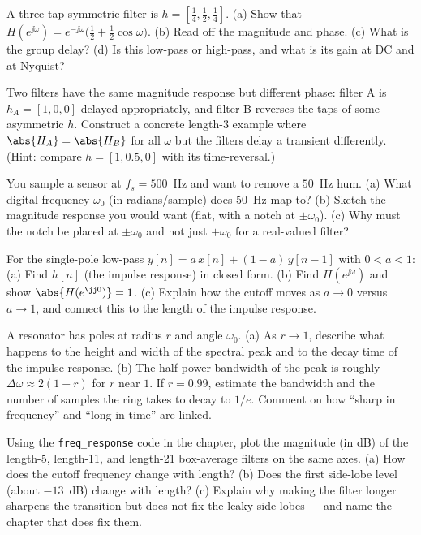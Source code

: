 \begin{exercise}
A three-tap symmetric filter is $h=[\tfrac14,\tfrac12,\tfrac14]$. (a) Show that
$H(e^{\jj\omega}) = e^{-\jj\omega}\big(\tfrac12 + \tfrac12\cos\omega\big)$.
(b) Read off the magnitude and phase. (c) What is the group delay? (d) Is this
low-pass or high-pass, and what is its gain at DC and at Nyquist?
\end{exercise}

\begin{exercise}
Two filters have the same magnitude response but different phase: filter A is
$h_A=[1,0,0]$ delayed appropriately, and filter B reverses the taps of some
asymmetric $h$. Construct a concrete length-3 example where $\abs{H_A}=\abs{H_B}$
for all $\omega$ but the filters delay a transient differently. (Hint: compare
$h=[1, 0.5, 0]$ with its time-reversal.)
\end{exercise}

\begin{exercise}
You sample a sensor at $f_s = 500$~Hz and want to remove a $50$~Hz hum.
(a) What digital frequency $\omega_0$ (in radians/sample) does $50$~Hz map to?
(b) Sketch the magnitude response you would want (flat, with a notch at
$\pm\omega_0$). (c) Why must the notch be placed at $\pm\omega_0$ and not just
$+\omega_0$ for a real-valued filter?
\end{exercise}

\begin{exercise}
For the single-pole low-pass $y[n]=a\,x[n]+(1-a)\,y[n-1]$ with $0<a<1$:
(a) Find $h[n]$ (the impulse response) in closed form.
(b) Find $H(e^{\jj\omega})$ and show $\abs{H(e^{\jj0})}=1$.
(c) Explain how the cutoff moves as $a\to 0$ versus $a\to 1$, and connect this
to the length of the impulse response.
\end{exercise}

\begin{exercise}
A resonator has poles at radius $r$ and angle $\omega_0$. (a) As $r\to 1$,
describe what happens to the height and width of the spectral peak and to the
decay time of the impulse response. (b) The half-power bandwidth of the peak is
roughly $\Delta\omega \approx 2(1-r)$ for $r$ near $1$. If $r=0.99$, estimate the
bandwidth and the number of samples the ring takes to decay to $1/e$. Comment on
how ``sharp in frequency'' and ``long in time'' are linked.
\end{exercise}

\begin{exercise}
Using the \texttt{freq\_response} code in the chapter, plot the magnitude (in dB)
of the length-5, length-11, and length-21 box-average filters on the same axes.
(a) How does the cutoff frequency change with length? (b) Does the first
side-lobe level (about $-13$~dB) change with length? (c) Explain why making the
filter longer sharpens the transition but does not fix the leaky side lobes ---
and name the chapter that does fix them.
\end{exercise}

